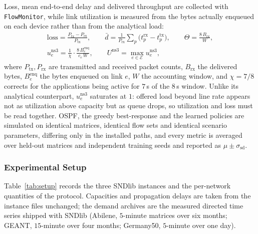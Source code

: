 Loss, mean end-to-end delay and delivered throughput are collected with \texttt{FlowMonitor},
while link utilization is measured from the bytes actually enqueued on each device rather than
from the analytical load:
\begin{equation}\label{eq:ns3-metrics}
\begin{gathered}
\mathrm{loss} = \frac{P_{\mathrm{tx}} - P_{\mathrm{rx}}}{P_{\mathrm{tx}}},
\qquad
\bar{d} = \frac{1}{P_{\mathrm{rx}}}\sum_{p}\bigl(t^{\mathrm{rx}}_p - t^{\mathrm{tx}}_p\bigr),
\qquad
\Theta = \frac{8\,B_{\mathrm{rx}}}{W}, \\[3pt]
u^{\mathrm{ns3}}_e = \frac{1}{\chi}\cdot\frac{8\,B^{\mathrm{enq}}_e}{c_e\,W},
\qquad
U^{\mathrm{ns3}} = \max_{e\in\mathcal{E}} u^{\mathrm{ns3}}_e ,
\end{gathered}
\end{equation}
where $P_{\mathrm{tx}},P_{\mathrm{rx}}$ are transmitted and received packet counts,
$B_{\mathrm{rx}}$ the delivered bytes, $B^{\mathrm{enq}}_e$ the bytes enqueued on link $e$, $W$
the accounting window, and $\chi = 7/8$ corrects for the applications being active for $7$\,s of
the $8$\,s window. Unlike its analytical counterpart, $u^{\mathrm{ns3}}_e$ saturates at $1$:
offered load beyond line rate appears not as utilization above capacity but as queue drops, so
utilization and loss must be read together. OSPF, the greedy best-response and the learned
policies are simulated on identical matrices, identical flow sets and identical scenario
parameters, differing only in the installed paths, and every metric is averaged over held-out
matrices and independent training seeds and reported as $\mu \pm \sigma_{\mathrm{sd}}$.

\subsubsection{Experimental Setup}
Table~\ref{tab:setup} records the three SNDlib instances and the per-network
quantities of the protocol. Capacities and propagation delays are taken from the
instance files unchanged; the demand archives are the measured
directed time series shipped with SNDlib (Abilene, $5$-minute matrices over six
months; GEANT, $15$-minute over four months; Germany50, $5$-minute over one
day).

